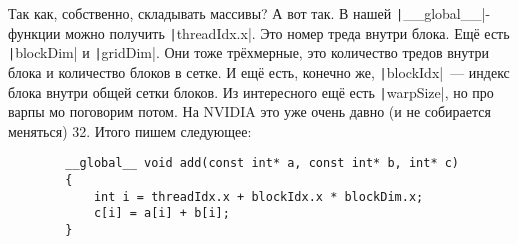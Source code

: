\documentclass{article}
\begin{document}
    Так как, собственно, складывать массивы? А вот так. В нашей \texttt|__global__|-функции можно получить \texttt|threadIdx.x|. Это номер треда внутри блока. Ещё есть \texttt|blockDim| и \texttt|gridDim|. Они тоже трёхмерные, это количество тредов внутри блока и количество блоков в сетке. И ещё есть, конечно же, \texttt|blockIdx|~--- индекс блока внутри общей сетки блоков. Из интересного ещё есть \texttt|warpSize|, но про варпы мо поговорим потом. На NVIDIA это уже очень давно (и не собирается меняться) 32. Итого пишем следующее:
    \begin{verbatim}
        __global__ void add(const int* a, const int* b, int* c)
        {
            int i = threadIdx.x + blockIdx.x * blockDim.x;
            c[i] = a[i] + b[i];
        }
    \end{verbatim}
\end{document}
